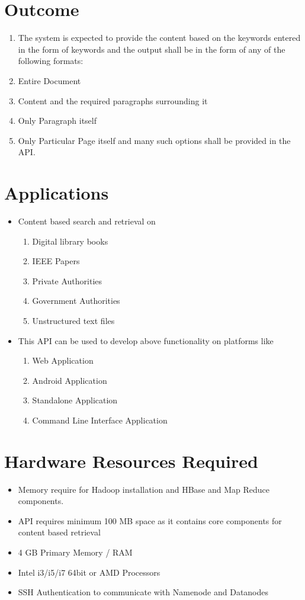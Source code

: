 \documentclass[oneside,a4paper,12pt]{report}
\begin{document}
\section{Outcome}
\begin{enumerate}
\item The system is expected to provide the content based on the keywords entered in the form of keywords and the output shall be in the form of any of the following formats:
\item Entire Document
\item Content and the required paragraphs surrounding it
\item Only Paragraph itself 
\item Only Particular Page itself
and many such options shall be provided in the API.
\end{enumerate}

\section{Applications}
\begin{itemize}
\item Content based search and retrieval on
\begin{enumerate}
\item Digital library books 
\item IEEE Papers
\item Private Authorities
\item Government Authorities
\item Unstructured text files
\end{enumerate}

\item This API can be used to develop above functionality on platforms like
\begin{enumerate}
\item Web Application
\item Android Application
\item Standalone Application
\item Command Line Interface Application
\end{enumerate}

\end{itemize}

\section{Hardware Resources Required}
\begin{itemize}	
\item Memory require for Hadoop installation and HBase and Map Reduce components.
\item API requires minimum 100 MB space as it contains core components for content based retrieval
\item 4 GB Primary Memory / RAM
\item Intel i3/i5/i7 64bit or AMD Processors
\item SSH Authentication to communicate with Namenode and Datanodes
\end{itemize}
\end{document}
